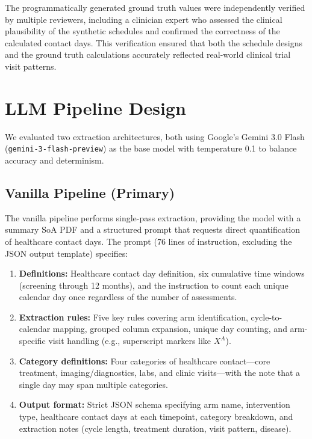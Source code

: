 \documentclass[11pt]{article}
\begin{document}
The programmatically generated ground truth values were independently verified by multiple reviewers, including a clinician expert who assessed the clinical plausibility of the synthetic schedules and confirmed the correctness of the calculated contact days. This verification ensured that both the schedule designs and the ground truth calculations accurately reflected real-world clinical trial visit patterns.

\section{LLM Pipeline Design}

We evaluated two extraction architectures, both using Google's Gemini 3.0 Flash (\texttt{gemini-3-flash-preview}) as the base model with temperature 0.1 to balance accuracy and determinism.

\subsection{Vanilla Pipeline (Primary)}

The vanilla pipeline performs single-pass extraction, providing the model with a summary SoA PDF and a structured prompt that requests direct quantification of healthcare contact days. The prompt (76 lines of instruction, excluding the JSON output template) specifies:

\begin{enumerate}[leftmargin=*]
    \item \textbf{Definitions:} Healthcare contact day definition, six cumulative time windows (screening through 12 months), and the instruction to count each unique calendar day once regardless of the number of assessments.
    \item \textbf{Extraction rules:} Five key rules covering arm identification, cycle-to-calendar mapping, grouped column expansion, unique day counting, and arm-specific visit handling (e.g., superscript markers like $X^A$).
    \item \textbf{Category definitions:} Four categories of healthcare contact---core treatment, imaging/diagnostics, labs, and clinic visits---with the note that a single day may span multiple categories.
    \item \textbf{Output format:} Strict JSON schema specifying arm name, intervention type, healthcare contact days at each timepoint, category breakdown, and extraction notes (cycle length, treatment duration, visit pattern, disease).
\end{enumerate}
\end{document}
